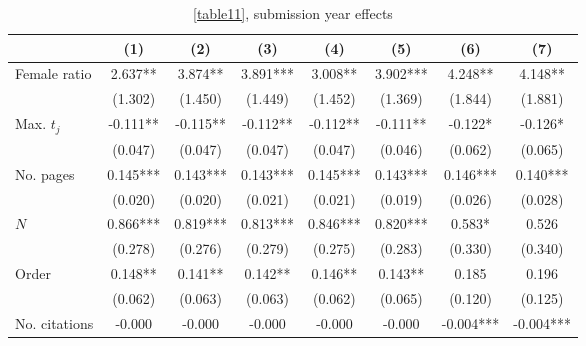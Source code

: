 \begin{table}[H]
    \begin{adjustwidth}{-0.085cm}{}
    \footnotesize
    \centering
    \begin{threeparttable}
        \caption{\autoref{table11}, submission year effects}
        \label{table11XXA}
        \begin{tabular}{p{2.64cm}SSSSSSS}
            \toprule
            &{(1)}&{(2)}&{(3)}&{(4)}&{(5)}&{(6)}&{(7)}\\
            \midrule
            Female ratio                  &       2.637** &       3.874** &       3.891***&       3.008** &       3.902***&       4.248** &       4.148** \\
                                          &     (1.302)   &     (1.450)   &     (1.449)   &     (1.452)   &     (1.369)   &     (1.844)   &     (1.881)   \\
            Max. \(t_j\)                  &      -0.111** &      -0.115** &      -0.112** &      -0.112** &      -0.111** &      -0.122*  &      -0.126*  \\
                                          &     (0.047)   &     (0.047)   &     (0.047)   &     (0.047)   &     (0.046)   &     (0.062)   &     (0.065)   \\
            No. pages                     &       0.145***&       0.143***&       0.143***&       0.145***&       0.143***&       0.146***&       0.140***\\
                                          &     (0.020)   &     (0.020)   &     (0.021)   &     (0.021)   &     (0.019)   &     (0.026)   &     (0.028)   \\
            \(N\)                         &       0.866***&       0.819***&       0.813***&       0.846***&       0.820***&       0.583*  &       0.526   \\
                                          &     (0.278)   &     (0.276)   &     (0.279)   &     (0.275)   &     (0.283)   &     (0.330)   &     (0.340)   \\
            Order                         &       0.148** &       0.141** &       0.142** &       0.146** &       0.143** &       0.185   &       0.196   \\
                                          &     (0.062)   &     (0.063)   &     (0.063)   &     (0.062)   &     (0.065)   &     (0.120)   &     (0.125)   \\
            No. citations                 &      -0.000   &      -0.000   &      -0.000   &      -0.000   &      -0.000   &      -0.004***&      -0.004***\\

\end{tabular}
\end{threeparttable}
\end{adjustwidth}
\end{table}
